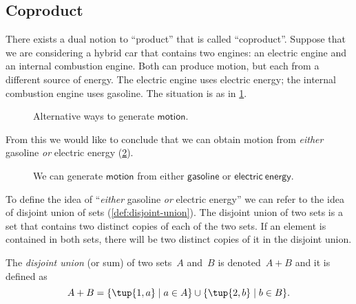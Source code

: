 \label{sec:coproductset}
\subsection{Coproduct}

There exists a dual notion to ``product'' that is called ``coproduct''. Suppose that we are considering a hybrid car that contains two engines: an
electric engine and an internal combustion engine. Both can produce \textsf{motion}, but each from a different source of energy. The electric engine uses \textsf{electric energy}; the internal combustion engine uses \textsf{gasoline}. The situation is as in \cref{fig:e16a}.

\begin{figure}[h!]
    \centering
    \caption{Alternative ways to generate $\mathsf{motion}$. \label{fig:e16a}}
\end{figure}

From this we would like to conclude that we can obtain \textsf{motion} from \emph{either} \textsf{gasoline} \emph{or} \textsf{electric energy} (\cref{fig:e16b}).

\begin{figure}[h!]
    \centering
    \caption{We can generate $\mathsf{motion}$ from either $\mathsf{gasoline}$ or $\mathsf{electric} \ \mathsf{energy}$. \label{fig:e16b}}
\end{figure}

To define the idea of ``\emph{either} \textsf{gasoline} \emph{or} \textsf{electric energy}'' we can refer to the idea of disjoint union of sets (\cref{def:disjoint-union}). The disjoint union of two sets is a set that contains two distinct copies of each of the two sets. If an element is contained in both sets, there will be two distinct copies of it in the disjoint union.

\begin{definition}
\label{def:disjoint-union}
    The \emph{disjoint union} (or sum) of two sets~$A$ and~$B$ is denoted~$A + B$
    and it is defined as
    \begin{equation}
        A + B=\{\tup{1,a}\mid a\in A\}\cup\{\tup{2,b}\mid b\in B\}.
    \end{equation}
\end{definition}

